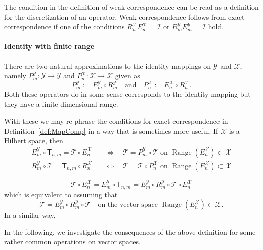 \documentclass[a4paper]{paper}
\newcommand{\VecSpace}[1]{\mathscr{#1}}
\newcommand{\Op}[1]{\mathcal{#1}}
\newcommand{\DiscOp}[1]{\mathsf{#1}}
\newcommand*{\EXT}[2]{\ensuremath{E_{#1}^{#2}}}
\newcommand*{\REST}[2]{\ensuremath{R_{#1}^{#2}}}
\newcommand*{\RnX}{\ensuremath{\REST{n}{\VecSpace{X}}}}
\newcommand*{\RmY}{\ensuremath{\REST{m}{\VecSpace{Y}}}}
\newcommand*{\EnX}{\ensuremath{\EXT{n}{\VecSpace{X}}}}
\newcommand*{\EmY}{\ensuremath{\EXT{m}{\VecSpace{Y}}}}
\DeclareMathOperator{\range}{Range}
\begin{document}
\begin{remark}
 The condition in the definition of weak correspondence can be read as a definition for the discretization of an operator. Weak 
 correspondence follows from exact correspondence if one of the conditions $\RnX\EnX = \Op{I}$ or $\RmY\EmY = \Op{I}$ hold.
\end{remark}


\paragraph{Identity with finite range}
There are two natural approximations to the identity mappings on $\VecSpace{Y}$ and $\VecSpace{X}$, 
namely $P^{\VecSpace{Y}}_{m} \colon \VecSpace{Y} \to \VecSpace{Y}$ and 
$P^{\VecSpace{X}}_{n}\colon \VecSpace{X} \to \VecSpace{X}$ given as 
\[  P^{\VecSpace{Y}}_{m} := E^{\VecSpace{Y}}_{m} \circ R^{\VecSpace{Y}}_{m}
   \quad\text{and}\quad
   P^{\VecSpace{X}}_{n} := E^{\VecSpace{X}}_{n} \circ R^{\VecSpace{X}}_{n}.
\]   
Both these operators do in some sense corresponds to the identity mapping but they have a finite dimensional range.

With these we may re-phrase the conditions for exact correspondence in Definition~\ref{def:MapComp}
in a way that is sometimes more useful. If $\VecSpace{X}$ is a Hilbert space, then
\begin{align*}
  E^{\VecSpace{Y}}_{m} \circ \DiscOp{T}_{n,m} = \Op{T} \circ E_{n}^{\VecSpace{X}}
    &\quad\iff\quad
    \Op{T} = P^{\VecSpace{Y}}_{m} \circ \Op{T}
    \text{ on $\range(E^{\VecSpace{X}}_{n}) \subset \VecSpace{X}$} \\
 R^{\VecSpace{Y}}_{m} \circ \Op{T} = \DiscOp{T}_{n,m} \circ R^{\VecSpace{X}}_{n}
    &\quad\iff\quad
    \Op{T} = \Op{T} \circ P^{\VecSpace{X}}_{n}
    \text{ on $\range(E^{\VecSpace{X}}_{n}) \subset \VecSpace{X}$}     
\end{align*}

\[  \Op{T} \circ E_{n}^{\VecSpace{X}} = E^{\VecSpace{Y}}_{m} \circ \DiscOp{T}_{n,m} 
      = E^{\VecSpace{Y}}_{m} \circ R^{\VecSpace{Y}}_{m} \circ \Op{T} \circ E^{\VecSpace{X}}_{n}
\]
which is equivalent to assuming that 
\[  \Op{T} = E^{\VecSpace{Y}}_{m} \circ R^{\VecSpace{Y}}_{m} \circ \Op{T}
     \quad\text{on the vector space $\range(E^{\VecSpace{X}}_{n}) \subset \VecSpace{X}$.} 
\]
In a similar way, 

In the following, we investigate the consequences of the above definition for some rather common operations
on vector spaces.
\end{document}
